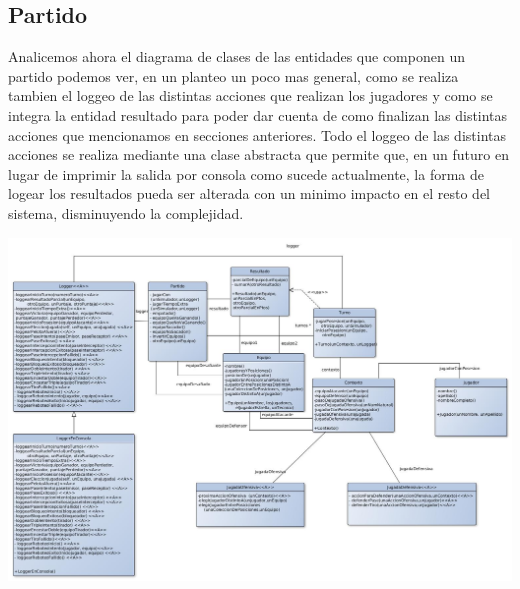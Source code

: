 \subsection{Partido}
Analicemos ahora el diagrama de clases de las entidades que componen un partido podemos ver, en un planteo un poco mas general, como se realiza tambien el loggeo de las distintas acciones que realizan los jugadores y como se integra la entidad resultado para poder dar cuenta de como finalizan las distintas acciones que mencionamos en secciones anteriores. Todo el loggeo de las distintas acciones se realiza mediante una clase abstracta que permite que, en un futuro en lugar de imprimir la salida por consola como sucede actualmente, la forma de logear los resultados pueda ser alterada con un minimo impacto en el resto del sistema, disminuyendo la complejidad.
\begin{center}
\includegraphics[scale=0.4, angle=90]{diseno/partido.jpg}
\end{center}

